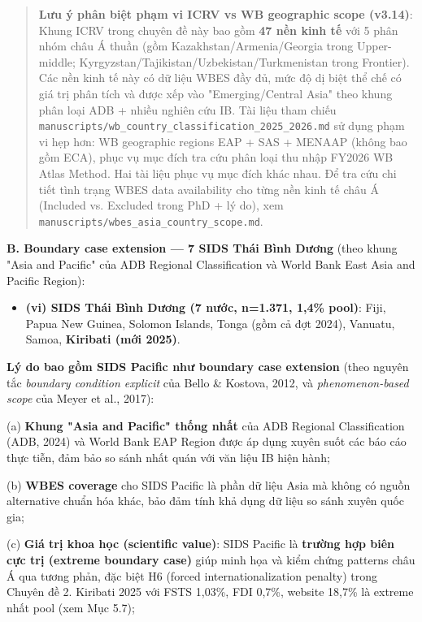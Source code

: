 \documentclass[12pt,a4paper]{article}
\providecommand{\tightlist}{\setlength{\itemsep}{0pt}\setlength{\parskip}{0pt}}
\begin{document}
\begin{quote}
\textbf{Lưu ý phân biệt phạm vi ICRV vs WB geographic scope (v3.14)}:
Khung ICRV trong chuyên đề này bao gồm \textbf{47 nền kinh tế} với 5
phân nhóm châu Á thuần (gồm Kazakhstan/Armenia/Georgia trong
Upper-middle; Kyrgyzstan/Tajikistan/Uzbekistan/Turkmenistan trong
Frontier). Các nền kinh tế này có dữ liệu WBES đầy đủ, mức độ dị biệt
thể chế có giá trị phân tích và được xếp vào "Emerging/Central Asia"
theo khung phân loại ADB + nhiều nghiên cứu IB. Tài liệu tham chiếu
\texttt{manuscripts/wb\_country\_classification\_2025\_2026.md} sử dụng
phạm vi hẹp hơn: WB geographic regions EAP + SAS + MENAAP (không bao gồm
ECA), phục vụ mục đích tra cứu phân loại thu nhập FY2026 WB Atlas
Method. Hai tài liệu phục vụ mục đích khác nhau. Để tra cứu chi tiết
tình trạng WBES data availability cho từng nền kinh tế châu Á (Included
vs. Excluded trong PhD + lý do), xem
\texttt{manuscripts/wbes\_asia\_country\_scope.md}.
\end{quote}

\textbf{B. Boundary case extension --- 7 SIDS Thái Bình Dương} (theo
khung "Asia and Pacific" của ADB Regional Classification và World Bank
East Asia and Pacific Region):

\begin{itemize}
\tightlist
\item
  \textbf{(vi) SIDS Thái Bình Dương (7 nước, n=1.371, 1,4\% pool)}:
  Fiji, Papua New Guinea, Solomon Islands, Tonga (gồm cả đợt 2024),
  Vanuatu, Samoa, \textbf{Kiribati (mới 2025)}.
\end{itemize}

\textbf{Lý do bao gồm SIDS Pacific như boundary case extension} (theo
nguyên tắc \emph{boundary condition explicit} của Bello \& Kostova,
2012, và \emph{phenomenon-based scope} của Meyer et al., 2017):

(a) \textbf{Khung "Asia and Pacific" thống nhất} của ADB Regional
Classification (ADB, 2024) và World Bank EAP Region được áp dụng xuyên
suốt các báo cáo thực tiễn, đảm bảo so sánh nhất quán với văn liệu IB
hiện hành;

(b) \textbf{WBES coverage} cho SIDS Pacific là phần dữ liệu Asia mà
không có nguồn alternative chuẩn hóa khác, bảo đảm tính khả dụng dữ liệu
so sánh xuyên quốc gia;

(c) \textbf{Giá trị khoa học (scientific value)}: SIDS Pacific là
\textbf{trường hợp biên cực trị (extreme boundary case)} giúp minh họa
và kiểm chứng patterns châu Á qua tương phản, đặc biệt H6 (forced
internationalization penalty) trong Chuyên đề 2. Kiribati 2025 với FSTS
1,03\%, FDI 0,7\%, website 18,7\% là extreme nhất pool (xem Mục 5.7);
\end{document}
